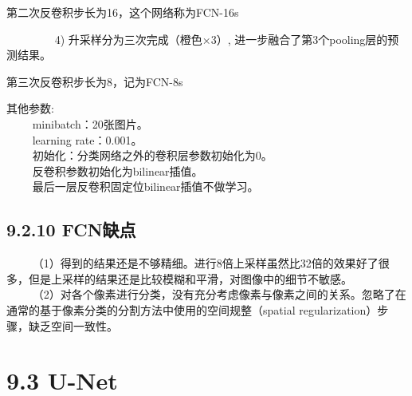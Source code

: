 第二次反卷积步长为16，这个网络称为FCN-16s

     4) 升采样分为三次完成（橙色×3）,
进一步融合了第3个pooling层的预测结果。

\begin{figure}
\centering
\end{figure}

第三次反卷积步长为8，记为FCN-8s

其他参数:\\
   minibatch：20张图片。\\
   learning rate：0.001。\\
   初始化：分类网络之外的卷积层参数初始化为0。\\
   反卷积参数初始化为bilinear插值。\\
   最后一层反卷积固定位bilinear插值不做学习。

\begin{figure}
\centering
\end{figure}

\subsection{9.2.10 FCN缺点}\label{fcnux7f3aux70b9}

  
（1）得到的结果还是不够精细。进行8倍上采样虽然比32倍的效果好了很多，但是上采样的结果还是比较模糊和平滑，对图像中的细节不敏感。\\
  
（2）对各个像素进行分类，没有充分考虑像素与像素之间的关系。忽略了在通常的基于像素分类的分割方法中使用的空间规整（spatial
regularization）步骤，缺乏空间一致性。

\section{9.3 U-Net}\label{u-net}

